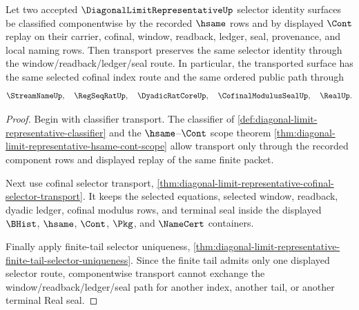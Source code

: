 \begin{theorem}
\label{thm:diagonal-limit-representative-selector-identity-transport}
Let two accepted $\DiagonalLimitRepresentativeUp$ selector identity surfaces be classified componentwise by the recorded $\hsame$ rows and by displayed $\Cont$ replay on their carrier, cofinal, window, readback, ledger, seal, provenance, and local naming rows. Then transport preserves the same selector identity through the window/readback/ledger/seal route. In particular, the transported surface has the same selected cofinal index route and the same ordered public path through
$$
\StreamNameUp,\quad \RegSeqRatUp,\quad \DyadicRatCoreUp,\quad \CofinalModulusSealUp,\quad \RealUp.
$$
\end{theorem}
\begin{proof}
Begin with classifier transport. The classifier of \autoref{def:diagonal-limit-representative-classifier} and the $\hsame$--$\Cont$ scope theorem \autoref{thm:diagonal-limit-representative-hsame-cont-scope} allow transport only through the recorded component rows and displayed replay of the same finite packet.

Next use cofinal selector transport, \autoref{thm:diagonal-limit-representative-cofinal-selector-transport}. It keeps the selected equations, selected window, readback, dyadic ledger, cofinal modulus rows, and terminal seal inside the displayed $\BHist$, $\hsame$, $\Cont$, $\Pkg$, and $\NameCert$ containers.

Finally apply finite-tail selector uniqueness, \autoref{thm:diagonal-limit-representative-finite-tail-selector-uniqueness}. Since the finite tail admits only one displayed selector route, componentwise transport cannot exchange the window/readback/ledger/seal path for another index, another tail, or another terminal Real seal.
\end{proof}

